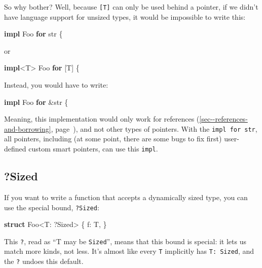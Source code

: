 \documentclass[a4paper,]{book}
\renewcommand*{\hyperref}[2][\ar]{%
  \def\ar{#2}%
  #2 (\autoref{#1}, page~\pageref{#1})}
\newenvironment{Shaded}{\begin{snugshade}}{\end{snugshade}}
\newcommand{\KeywordTok}[1]{\textcolor[rgb]{0.13,0.29,0.53}{\textbf{{#1}}}}
\newcommand{\DataTypeTok}[1]{\textcolor[rgb]{0.13,0.29,0.53}{{#1}}}
\newcommand{\BuiltInTok}[1]{{#1}}
\newcommand{\NormalTok}[1]{{#1}}
\begin{document}
So why bother? Well, because \texttt{{[}T{]}} can only be used behind a
pointer, if we didn't have language support for unsized types, it would
be impossible to write this:

\begin{Shaded}
\begin{Highlighting}[]
\KeywordTok{impl} \NormalTok{Foo }\KeywordTok{for} \DataTypeTok{str} \NormalTok{\{}
\end{Highlighting}
\end{Shaded}

or

\begin{Shaded}
\begin{Highlighting}[]
\KeywordTok{impl}\NormalTok{<T> Foo }\KeywordTok{for} \NormalTok{[T] \{}
\end{Highlighting}
\end{Shaded}

Instead, you would have to write:

\begin{Shaded}
\begin{Highlighting}[]
\KeywordTok{impl} \NormalTok{Foo }\KeywordTok{for} \NormalTok{&}\DataTypeTok{str} \NormalTok{\{}
\end{Highlighting}
\end{Shaded}

Meaning, this implementation would only work for
\hyperref[sec--references-and-borrowing]{references}, and not other
types of pointers. With the \texttt{impl\ for\ str}, all pointers,
including (at some point, there are some bugs to fix first) user-defined
custom smart pointers, can use this \texttt{impl}.

\subsection{?Sized}\label{sized}

If you want to write a function that accepts a dynamically sized type,
you can use the special bound, \texttt{?Sized}:

\begin{Shaded}
\begin{Highlighting}[]
\KeywordTok{struct} \NormalTok{Foo<T: ?}\BuiltInTok{Sized}\NormalTok{> \{}
    \NormalTok{f: T,}
\NormalTok{\}}
\end{Highlighting}
\end{Shaded}

This \texttt{?}, read as ``T may be \texttt{Sized}'', means that this
bound is special: it lets us match more kinds, not less. It's almost
like every \texttt{T} implicitly has \texttt{T:\ Sized}, and the
\texttt{?} undoes this default.
\end{document}
